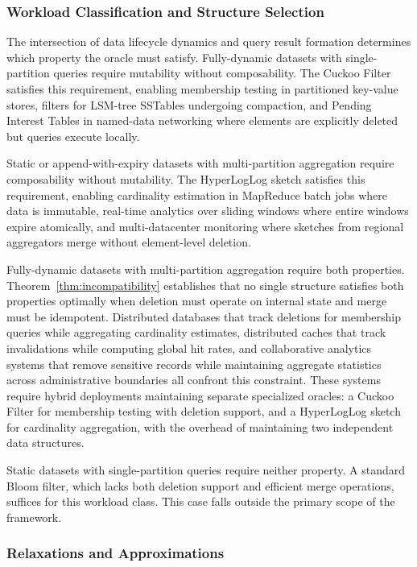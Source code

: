 \subsubsection{Workload Classification and Structure Selection}

The intersection of data lifecycle dynamics and query result formation determines which property the oracle must satisfy. Fully-dynamic datasets with single-partition queries require mutability without composability. The Cuckoo Filter satisfies this requirement, enabling membership testing in partitioned key-value stores, filters for LSM-tree SSTables undergoing compaction, and Pending Interest Tables in named-data networking where elements are explicitly deleted but queries execute locally.

Static or append-with-expiry datasets with multi-partition aggregation require composability without mutability. The HyperLogLog sketch satisfies this requirement, enabling cardinality estimation in MapReduce batch jobs where data is immutable, real-time analytics over sliding windows where entire windows expire atomically, and multi-datacenter monitoring where sketches from regional aggregators merge without element-level deletion.

Fully-dynamic datasets with multi-partition aggregation require both properties. Theorem~\ref{thm:incompatibility} establishes that no single structure satisfies both properties optimally when deletion must operate on internal state and merge must be idempotent. Distributed databases that track deletions for membership queries while aggregating cardinality estimates, distributed caches that track invalidations while computing global hit rates, and collaborative analytics systems that remove sensitive records while maintaining aggregate statistics across administrative boundaries all confront this constraint. These systems require hybrid deployments maintaining separate specialized oracles: a Cuckoo Filter for membership testing with deletion support, and a HyperLogLog sketch for cardinality aggregation, with the overhead of maintaining two independent data structures.

Static datasets with single-partition queries require neither property. A standard Bloom filter, which lacks both deletion support and efficient merge operations, suffices for this workload class. This case falls outside the primary scope of the framework.

\subsubsection{Relaxations and Approximations}

